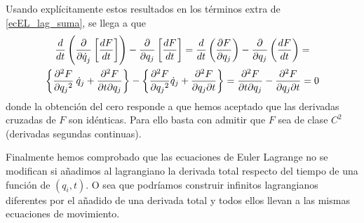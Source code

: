 \documentclass[10pt,oneside]{CBFT_book}
\begin{document}
Usando explícitamente estos resultados en los términos extra de \eqref{ecEL_lag_suma}, se llega 
a que 
\begin{multline*}
 	\dtot{}{t}\left(\dpar{}{\dot{q}_j}\left[ \dtot{F}{t} \right]\right) 
	- \dpar{}{q_j}\left[ \dtot{F}{t}\right] =
	\dtot{}{t}\left( \dpar{F}{q_j} \right) - \dpar{}{q_j}\left( \dtot{F}{t}\right) = \\
	\left\{ \dpar[2]{F}{q_j} \: \dot{q}_j + \dparcru{F}{q_j}{t} \right\}%
	- \left\{ \dpar[2]{F}{q_j} \dot{q}_j + \dparcru{F}{t}{q_j} \right\} =
	\dparcru{F}{q_j}{t} - \dparcru{F}{t}{q_j} = 0
\end{multline*}
donde la obtención del cero responde a que hemos aceptado que las derivadas cruzadas de $F$ son idénticas.
Para ello basta con admitir que $F$ sea de clase $C^2$ (derivadas segundas continuas).

Finalmente hemos comprobado que las ecuaciones de Euler Lagrange no se modifican si añadimos al lagrangiano la 
derivada total respecto del tiempo de una función de $(q_i,t)$.
O sea que podríamos construir infinitos lagrangianos diferentes por el añadido de una derivada total y todos
ellos llevan a las mismas ecuaciones de movimiento.
\end{document}
